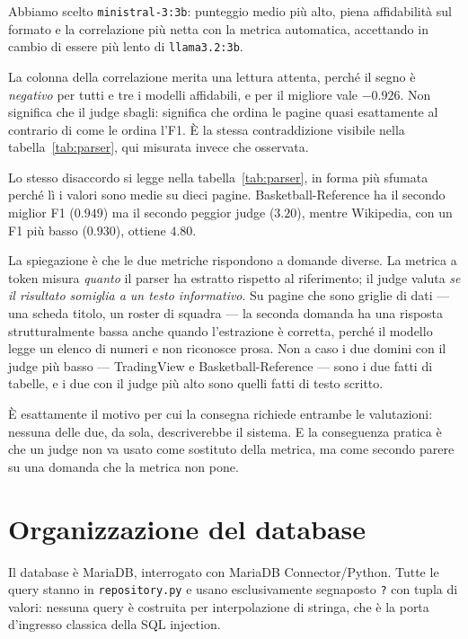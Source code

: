 \documentclass[10pt,a4paper,twocolumn]{article}
\begin{document}
Abbiamo scelto \texttt{ministral-3:3b}: punteggio medio più alto, piena
affidabilità sul formato e la correlazione più netta con la metrica automatica,
accettando in cambio di essere più lento di \texttt{llama3.2:3b}.

La colonna della correlazione merita una lettura attenta, perché il segno è
\emph{negativo} per tutti e tre i modelli affidabili, e per il migliore vale
$-0.926$. Non significa che il judge sbagli: significa che ordina le pagine
quasi esattamente al contrario di come le ordina l'F1. È la stessa
contraddizione visibile nella tabella~\ref{tab:parser}, qui misurata invece che
osservata.

Lo stesso disaccordo si legge nella tabella~\ref{tab:parser}, in forma più
sfumata perché lì i valori sono medie su dieci pagine.
Basketball-Reference ha il secondo miglior F1 ($0.949$) ma il secondo peggior
judge ($3.20$), mentre Wikipedia, con un F1 più basso ($0.930$), ottiene
$4.80$.

La spiegazione è che le due metriche rispondono a domande diverse. La metrica
a token misura \emph{quanto} il parser ha estratto rispetto al riferimento; il
judge valuta \emph{se il risultato somiglia a un testo informativo}. Su pagine
che sono griglie di dati --- una scheda titolo, un roster di squadra --- la
seconda domanda ha una risposta strutturalmente bassa anche quando
l'estrazione è corretta, perché il modello legge un elenco di numeri e non
riconosce prosa. Non a caso i due domini con il judge più basso —
TradingView e Basketball-Reference — sono i due fatti di tabelle, e i due con
il judge più alto sono quelli fatti di testo scritto.

È esattamente il motivo per cui la consegna richiede entrambe le valutazioni:
nessuna delle due, da sola, descriverebbe il sistema. E la conseguenza pratica
è che un judge non va usato come sostituto della metrica, ma come secondo
parere su una domanda che la metrica non pone.

\section{Organizzazione del database}

Il database è MariaDB, interrogato con MariaDB Connector/Python. Tutte le
query stanno in \texttt{repository.py} e usano esclusivamente segnaposto
\texttt{?} con tupla di valori: nessuna query è costruita per interpolazione
di stringa, che è la porta d'ingresso classica della SQL injection.
\end{document}
